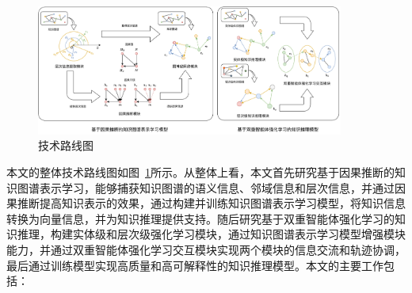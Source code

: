 \documentclass[algorithmlist, AutoFakeBold, AutoFakeSlant, figurelist, tablelist, nomlist, masters]{seuthesix}
\begin{document}
\begin{figure}
  \centering
  \includegraphics[width=0.9\textwidth]{1_Total}
  \caption{技术路线图}
  \label{1_Total}
\end{figure}
本文的整体技术路线图如图~\ref{1_Total}所示。从整体上看，本文首先研究基于因果推断的知识图谱表示学习，能够捕获知识图谱的语义信息、邻域信息和层次信息，并通过因果推断提高知识表示的效果，通过构建并训练知识图谱表示学习模型，将知识信息转换为向量信息，并为知识推理提供支持。随后研究基于双重智能体强化学习的知识推理，构建实体级和层次级强化学习模块，通过知识图谱表示学习模型增强模块能力，并通过双重智能体强化学习交互模块实现两个模块的信息交流和轨迹协调，最后通过训练模型实现高质量和高可解释性的知识推理模型。本文的主要工作包括：
\end{document}

